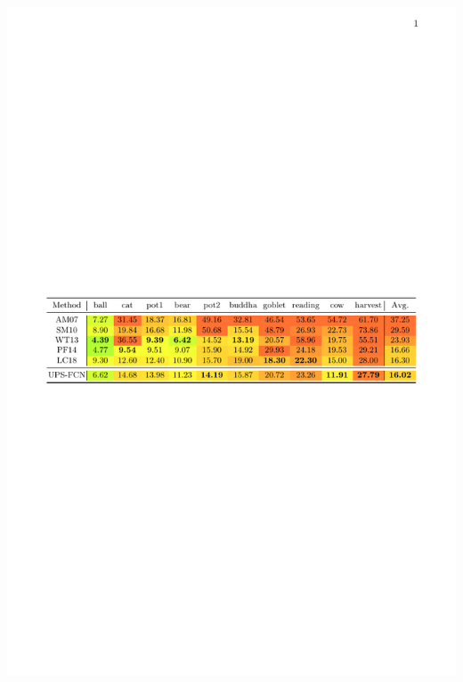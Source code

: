 \documentclass[portrait,a0paper,fontscale=0.292]{baposter}
\begin{document}
\begin{poster}
{\begin{minipage}[t]{0.4\textwidth}
        \begin{center}
            \includegraphics[width=\textwidth]{images/res_uncalibrated}
        \end{center}


\end{minipage}}
\end{poster}
\end{document}
